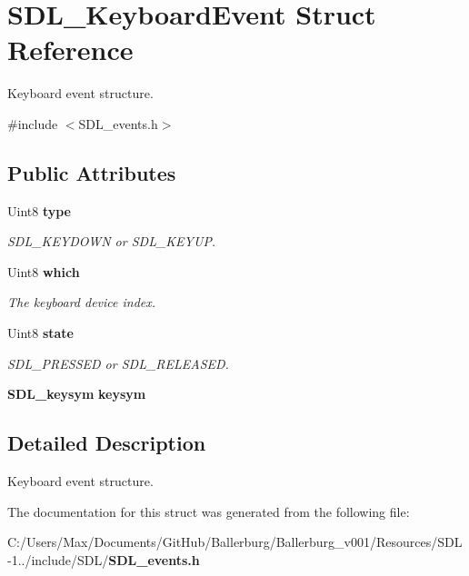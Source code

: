 \section{S\+D\+L\+\_\+\+Keyboard\+Event Struct Reference}
\label{struct_s_d_l___keyboard_event}


Keyboard event structure.  




{\ttfamily \#include $<$S\+D\+L\+\_\+events.\+h$>$}

\subsection*{Public Attributes}
\begin{DoxyCompactItemize}
\item 
Uint8 {\bf type}\label{struct_s_d_l___keyboard_event_a325194806bc8a4a259fc6c610d487293}

\begin{DoxyCompactList}\small\item\em S\+D\+L\+\_\+\+K\+E\+Y\+D\+O\+W\+N or S\+D\+L\+\_\+\+K\+E\+Y\+U\+P. \end{DoxyCompactList}\item 
Uint8 {\bf which}\label{struct_s_d_l___keyboard_event_acb25972bab6a9f142de5652530857b9b}

\begin{DoxyCompactList}\small\item\em The keyboard device index. \end{DoxyCompactList}\item 
Uint8 {\bf state}\label{struct_s_d_l___keyboard_event_a110558eb96c113c86cfa31a7018c2346}

\begin{DoxyCompactList}\small\item\em S\+D\+L\+\_\+\+P\+R\+E\+S\+S\+E\+D or S\+D\+L\+\_\+\+R\+E\+L\+E\+A\+S\+E\+D. \end{DoxyCompactList}\item 
{\bf S\+D\+L\+\_\+keysym} {\bfseries keysym}\label{struct_s_d_l___keyboard_event_aff2459de9aae91c753611b8947af8fc1}

\end{DoxyCompactItemize}


\subsection{Detailed Description}
Keyboard event structure. 

The documentation for this struct was generated from the following file\+:\begin{DoxyCompactItemize}
\item 
C\+:/\+Users/\+Max/\+Documents/\+Git\+Hub/\+Ballerburg/\+Ballerburg\+\_\+v001/\+Resources/\+S\+D\+L-\/1../include/\+S\+D\+L/{\bf S\+D\+L\+\_\+events.\+h}\end{DoxyCompactItemize}

